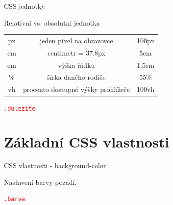 \documentclass[aspectratio=1610]{beamer}
\begin{document}
\begin{frame}{CSS jednotky}
    \begin{cardTiny}
        Relativní vs. absolutní jednotka

        \begin{center}
            \begin{tabular}{ |c|c|c| } 
                \hline
                px & jeden pixel na obrazovce & 100px \\ 
                cm & centimetr = 37.8px & 5cm \\ 
                em & výška řádku & 1.5em \\ 
                \% & šírka daného rodiče & 55\% \\ 
                vh & procento dostupné výšky prohlížeče & 100vh \\ 
                \hline
            \end{tabular}
        \end{center}
    \end{cardTiny}

    \begin{cardTiny}
        \begin{alltt}
            \textcolor{red}{.dulezite} \string{\\
                \textcolor{blue}{font-size}: \textcolor{orange}{5em};\\
            \string}
        \end{alltt}
    \end{cardTiny}
\end{frame}



\section{Základní CSS vlastnosti}

\begin{frame}{CSS vlastnosti - background-color}
    \begin{cardTiny}
        Nastavení barvy pozadí.

        \begin{alltt}
            \textcolor{red}{.barva} \string{\\
                \textcolor{blue}{background-color}: \textcolor{orange}{white};\\
            \string}
        \end{alltt}
    \end{cardTiny}
\end{frame}
\end{document}
